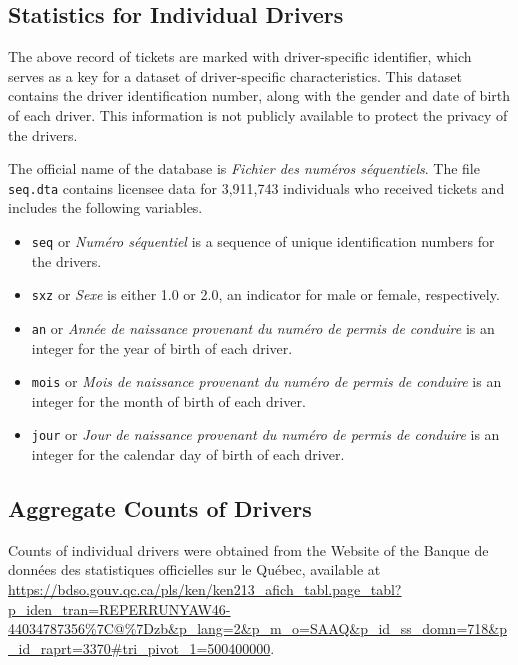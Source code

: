 \documentclass[11pt]{paper}
\begin{document}
\subsection*{Statistics for Individual Drivers}

The above record of tickets are marked with
driver-specific identifier, which serves as a key for 
a dataset of driver-specific characteristics.
This dataset contains the driver identification number, 
along with the gender and date of birth of each driver.
This information is not publicly available
to protect the privacy of the drivers.

The official name of the database is 
\emph{Fichier des num\'{e}ros s\'{e}quentiels}. 
The file \texttt{seq.dta} contains licensee data 
for 3,911,743 individuals who received tickets
and includes the following variables.

\begin{itemize}

\item \texttt{seq} 
or \emph{Num\'{e}ro s\'{e}quentiel} 
is a sequence of unique identification numbers for the drivers.
\item \texttt{sxz} 
or \emph{Sexe}
is either 1.0 or 2.0, an indicator for male or female, respectively.
\item \texttt{an} 
or \emph{Ann\'{e}e de naissance provenant du num\'{e}ro de permis de conduire}
is an integer for the year of birth of each driver.
\item \texttt{mois} 
or \emph{Mois de naissance provenant du num\'{e}ro de permis de conduire}
is an integer for the month of birth of each driver.
\item \texttt{jour} 
or \emph{Jour de naissance provenant du num\'{e}ro de permis de conduire}
is an integer for the calendar day of birth of each driver.

\end{itemize}


\subsection*{Aggregate Counts of Drivers}


Counts of individual drivers were obtained 
from the Website of the 
Banque de donn\'{e}es des statistiques officielles sur le Qu\'{e}bec, 
available at
\url{https://bdso.gouv.qc.ca/pls/ken/ken213_afich_tabl.page_tabl?p_iden_tran=REPERRUNYAW46-44034787356%7C@%7Dzb&p_lang=2&p_m_o=SAAQ&p_id_ss_domn=718&p_id_raprt=3370#tri_pivot_1=500400000}. 
\end{document}
